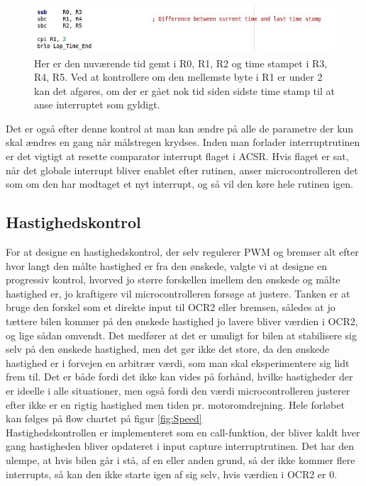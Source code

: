 \begin{figure}[h]

	\centering
		\includegraphics[scale=0.5]{Billeder/LapTime.jpg}
	\caption{Her er den nuværende tid gemt i R0, R1, R2 og time stampet i R3, R4, R5. Ved at kontrollere om den mellemste byte i R1 er under 2 kan det afgøres, om der er gået nok tid siden sidste time stamp til at anse interruptet som gyldigt.}
	\label{fig:LapTime}
	
\end{figure}

Det er også efter denne kontrol at man kan ændre på alle de parametre der kun skal ændres en gang når målstregen krydses. Inden man forlader interruptrutinen er det vigtigt at resette comparator interrupt flaget i ACSR. Hvis flaget er sat, når det globale interrupt bliver enablet efter rutinen, anser microcontrolleren det som om den har modtaget et nyt interrupt, og så vil den køre hele rutinen igen.

\subsection{Hastighedskontrol}

For at designe en hastighedskontrol, der selv regulerer PWM og bremser alt efter hvor langt den målte hastighed er fra den ønskede, valgte vi at designe en progressiv kontrol, hvorved jo større forskellen imellem den ønskede og målte hastighed er, jo kraftigere vil microcontrolleren forsøge at justere. Tanken er at bruge den forskel som et direkte input til OCR2 eller bremsen, således at jo tættere bilen kommer på den ønskede hastighed jo lavere bliver værdien i OCR2, og lige sådan omvendt. Det medfører at det er umuligt for bilen at stabilisere sig selv på den ønskede hastighed, men det gør ikke det store, da den ønskede hastighed er i forvejen en arbitrær værdi, som man skal eksperimentere sig lidt frem til. Det er både fordi det ikke kan vides på forhånd, hvilke hastigheder der er ideelle i alle situationer, men også fordi den værdi microcontrolleren justerer efter ikke er en rigtig hastighed men tiden pr. motoromdrejning. Hele forløbet kan følges på flow chartet på figur \ref{fig:Speed}\\
Hastighedskontrollen er implementeret som en call-funktion, der bliver kaldt hver gang hastigheden bliver opdateret i input capture interruptrutinen. Det har den ulempe, at hvis bilen går i stå, af en eller anden grund, så der ikke kommer flere interrupts, så kan den ikke starte igen af sig selv, hvis værdien i OCR2 er 0. \\
